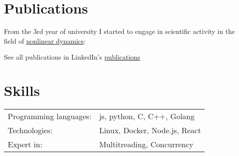 \documentclass[a4paper,12pt]{article}
\begin{document}
\section{Publications}

From the 3rd year of university I started to engage in scientific activity in the field of \href{https://www.wikiwand.com/en/Nonlinear_system}{nonlinear dynamics}:

\begin{refsection}
\nocite{*}
\printbibliography[heading=none]
\end{refsection}

See all publications in LinkedIn's \href{https://www.linkedin.com/in/dmitry-khorkin/details/publications/}{publications}

\section{Skills}
\begin{tabularx}{\linewidth}{@{}l X@{}}
Programming languages: & \normalsize{js, python, C, C++, Golang} \\
Technologies: & \normalsize{Linux, Docker, Node.js, React} \\
Expert in: & \normalsize{Multitreading, Concurrency} \\
\end{tabularx}

\vfill
{}
 
\end{document}
